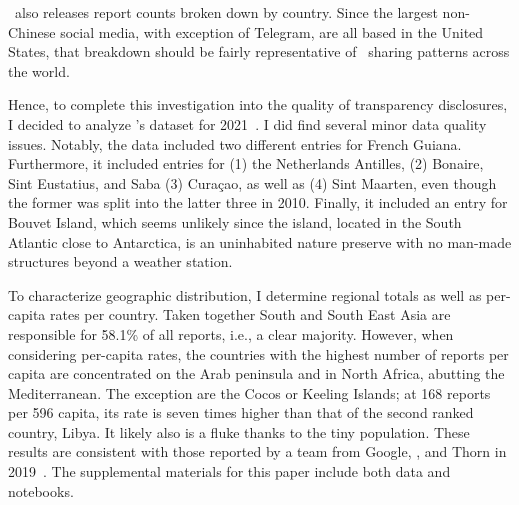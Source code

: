 \NCMEC\ also releases report counts broken down by country. Since the largest
non-Chinese social media, with exception of Telegram, are all based in the
United States, that breakdown should be fairly representative of \CSAM\ sharing
patterns across the world.

Hence, to complete this investigation into the quality of transparency
disclosures, I decided to analyze \NCMEC's dataset for
2021~\cite{NcmecByCountry2021}. I did find several minor data quality issues.
Notably, the data included two different entries for French Guiana. Furthermore,
it included entries for (1) the Netherlands Antilles, (2) Bonaire, Sint
Eustatius, and Saba (3) Curaçao, as well as (4) Sint Maarten, even though the
former was split into the latter three in 2010. Finally, it included an entry
for Bouvet Island, which seems unlikely since the island, located in the South
Atlantic close to Antarctica, is an uninhabited nature preserve with no man-made
structures beyond a weather station.

To characterize geographic distribution, I determine regional totals as well as
per-capita rates per country. Taken together South and South East Asia are
responsible for 58.1\% of all reports, i.e., a clear majority. However, when
considering per-capita rates, the countries with the highest number of reports
per capita are concentrated on the Arab peninsula and in North Africa, abutting
the Mediterranean. The exception are the Cocos or Keeling Islands; at 168
reports per 596 capita, its rate is seven times higher than that of the second
ranked country, Libya. It likely also is a fluke thanks to the tiny population.
These results are consistent with those reported by a team from Google, \NCMEC,
and Thorn in 2019~\cite{BurszteinBrightea2019}. The supplemental materials for
this paper include both data and notebooks.
